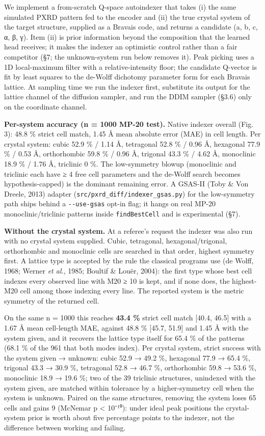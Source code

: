 \documentclass[
  11pt,
]{article}
\newcounter{none} %
\begin{document}
We implement a from-scratch Q-space autoindexer that takes (i) the same
simulated PXRD pattern fed to the encoder and (ii) the true crystal
system of the target structure, supplied as a Bravais code, and returns
a candidate (a, b, c, α, β, γ). Item (ii) is prior information beyond
the composition that the learned head receives; it makes the indexer an
optimistic control rather than a fair competitor (§7; the unknown-system
run below removes it). Peak picking uses a 1D local-maximum filter with
a relative-intensity floor; the candidate Q-vector is fit by least
squares to the de-Wolff dichotomy parameter form for each Bravais
lattice. At sampling time we run the indexer first, substitute its
output for the lattice channel of the diffusion sampler, and run the
DDIM sampler (§3.6) only on the coordinate channel.

\textbf{Per-system accuracy (n = 1000 MP-20 test).} Native indexer
overall (Fig. 3): 48.8 \% strict cell match, 1.45 Å mean absolute error
(MAE) in cell length. Per crystal system: cubic 52.9 \% / 1.14 Å,
tetragonal 52.8 \% / 0.96 Å, hexagonal 77.9 \% / 0.53 Å, orthorhombic
59.8 \% / 0.96 Å, trigonal 43.3 \% / 4.62 Å, monoclinic 18.9 \% / 1.76
Å, triclinic 0 \%. The low-symmetry blowup (monoclinic and triclinic
each have ≥ 4 free cell parameters and the de-Wolff search becomes
hypothesis-capped) is the dominant remaining error. A GSAS-II (Toby \&
Von Dreele, 2013) adapter (\texttt{src/pxrd\_diff/indexer\_gsas.py}) for
the low-symmetry path ships behind a \texttt{-\/-use-gsas} opt-in flag;
it hangs on real MP-20 monoclinic/triclinic patterns inside
\texttt{findBestCell} and is experimental (§7).

\textbf{Without the crystal system.} At a referee's request the indexer
was also run with no crystal system supplied. Cubic, tetragonal,
hexagonal/trigonal, orthorhombic and monoclinic cells are searched in
that order, highest symmetry first. A lattice type is accepted by the
rule the classical programs use (de Wolff, 1968; Werner \emph{et al.},
1985; Boultif \& Louër, 2004): the first type whose best cell indexes
every observed line with M20 ≥ 10 is kept, and if none does, the
highest-M20 cell among those indexing every line. The reported system is
the metric symmetry of the returned cell.

On the same n = 1000 this reaches \textbf{43.4 \%} strict cell match
{[}40.4, 46.5{]} with a 1.67 Å mean cell-length MAE, against 48.8 \%
{[}45.7, 51.9{]} and 1.45 Å with the system given, and it recovers the
lattice type itself for 65.4 \% of the patterns (68.1 \% of the 961 that
both modes index). Per crystal system, strict success with the system
given → unknown: cubic 52.9 → 49.2 \%, hexagonal 77.9 → 65.4 \%,
trigonal 43.3 → 30.9 \%, tetragonal 52.8 → 46.7 \%, orthorhombic 59.8 →
53.6 \%, monoclinic 18.9 → 19.6 \%; two of the 39 triclinic structures,
unindexed with the system given, are matched within tolerance by a
higher-symmetry cell when the system is unknown. Paired on the same
structures, removing the system loses 65 cells and gains 9 (McNemar p
\textless{} 10⁻¹⁰): under ideal peak positions the crystal-system prior
is worth about five percentage points to the indexer, not the difference
between working and failing.
\end{document}
